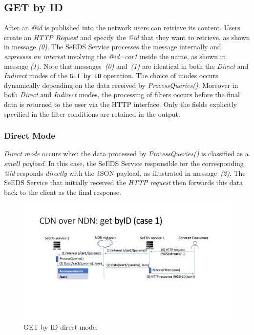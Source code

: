 \documentclass{article}
\begin{document}
\subsection{GET by ID}\label{get_by_id_section}



After an \textit{@id} is published into the network users can retrieve its content. Users create an \emph{HTTP Request} and specify the \textit{@id} that they want to retrieve, as shown in message \emph{(0)}. The SeEDS Service processes the message internally and \emph{expresses an interest} involving the \textit{@id=car1} inside the name, as shown in message \emph{(1)}. Note that messages~\emph{(0)} and~\emph{(1)} are identical in both the \emph{Direct} and \emph{Indirect} modes of the \texttt{GET by ID} operation. The choice of modes occurs dynamically depending on the data received by \textit{ProcessQueries()}. Moreover in both \emph{Direct} and \emph{Indirect} modes, the processing of filters occurs before the final data is returned to the user via the HTTP interface. Only the fields explicitly specified in the filter conditions are retained in the output. 


\subsubsection{Direct Mode}

\emph{Direct mode} occurs when the data processed by \textit{ProcessQueries()} is classified as a \emph{small payload}. In this case, the SeEDS Service responsible for the corresponding \textit{@id} responds \emph{directly} with the JSON payload, as illustrated in message~\emph{(2)}. The SeEDS Service that initially received the \emph{HTTP request} then forwards this data back to the client as the final response.

\begin{figure}[H]
    \centering
    \includegraphics[width=0.8\linewidth]{images/get_by_id_direct.png}
    \caption{GET by ID direct mode.}
    \label{fig:get_by_id_direct}
\end{figure}
\end{document}
